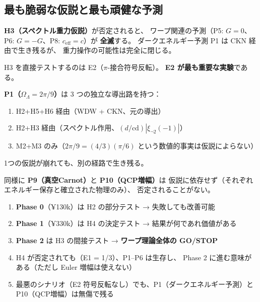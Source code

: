 \subsection*{最も脆弱な仮説と最も頑健な予測}

\begin{tcolorbox}[colback=red!5,colframe=red!60!black,title=最も脆弱（single point of failure）]
\textbf{H3（スペクトル重力仮説）}が否定されると、
ワープ関連の予測（P5: $G=0$、P6: $G=-G$、P8: $c_{\mathrm{eff}}=c$）が
\textbf{全滅}する。
ダークエネルギー予測 P1 は CKN 経由で生き残るが、
重力操作の可能性は完全に閉じる。

H3 を直接テストするのは E2（$\pi$-接合符号反転）。
\textbf{E2 が最も重要な実験}である。
\end{tcolorbox}

\begin{tcolorbox}[colback=green!5,colframe=green!60!black,title=最も頑健（多重の独立な根拠）]
\textbf{P1（$\Omega_\Lambda = 2\pi/9$）}は 3 つの独立な導出路を持つ：
\begin{enumerate}
\item H2+H5+H6 経由（WDW + CKN、元の導出）
\item H2+H3 経由（スペクトル作用、$(d/\mathrm{cd})|\xi_{\neg 2}(-1)|$）
\item M2+M3 のみ（$2\pi/9 = (4/3)(\pi/6)$ という数値的事実は仮説によらない）
\end{enumerate}
1つの仮説が崩れても、別の経路で生き残る。

同様に \textbf{P9（真空Carnot）}と \textbf{P10（QCP増幅）}は
仮説に依存せず（それぞれエネルギー保存と確立された物理のみ）、
否定されることがない。
\end{tcolorbox}

\begin{tcolorbox}[colback=blue!5,colframe=blue!50!black,title=実験戦略への示唆]
\begin{enumerate}
\item \textbf{Phase 0}（¥130k）は H2 の部分テスト → 失敗しても改善可能
\item \textbf{Phase 1}（¥330k）は H4 の決定テスト → 結果が何であれ価値がある
\item \textbf{Phase 2} は H3 の間接テスト → \textbf{ワープ理論全体の GO/STOP}
\item H4 が否定されても（E1 = 1/3）、P1--P6 は生存し、
  Phase 2 に進む意味がある（ただし Euler 増幅は使えない）
\item 最悪のシナリオ（E2 符号反転なし）でも、P1（ダークエネルギー予測）と
  P10（QCP増幅）は無傷で残る
\end{enumerate}
\end{tcolorbox}

\newpage
